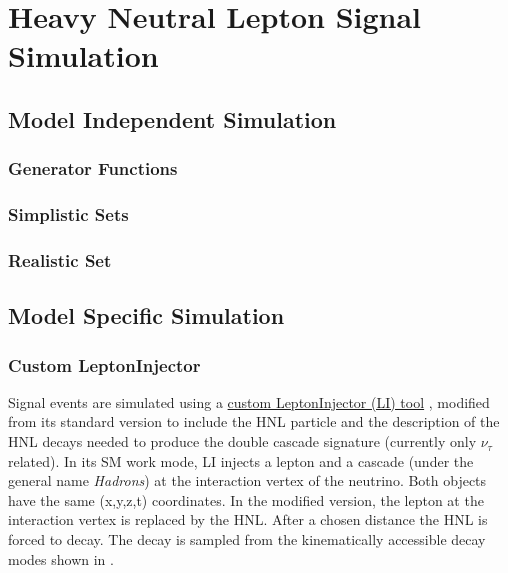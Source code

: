 \setchapterpreamble[u]{\margintoc}

\chapter{Heavy Neutral Lepton Signal Simulation}



\section{Model Independent Simulation}

\subsection{Generator Functions}

\subsection{Simplistic Sets}

\subsection{Realistic Set}




\section{Model Specific Simulation} 


\subsection{Custom LeptonInjector} 

Signal events are simulated using a \href{https://github.com/LeanderFischer/LeptonInjector-HNL/tree/main/LeptonInjector}{custom LeptonInjector (LI) tool} , modified from its standard version to include the HNL particle and the description of the HNL decays needed to produce the double cascade signature (currently only $\nu_{\tau}$ related). In its SM work mode, LI injects a lepton and a cascade (under the general name \textit{Hadrons}) at the interaction vertex of the neutrino. Both objects have the same (x,y,z,t) coordinates. In the modified version, the lepton at the interaction vertex is replaced by the HNL. After a chosen distance the HNL is forced to decay. The decay is sampled from the kinematically accessible decay modes shown in .

